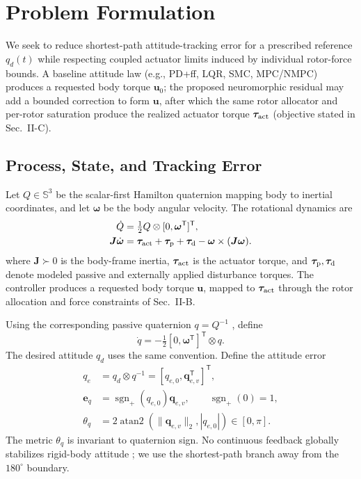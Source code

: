 \documentclass[letterpaper, 10 pt, conference]{ieeeconf}
\newcommand{\T}{^{\mathsf T}}
\newcommand{\sgnp}{\operatorname{sgn}_{+}}
\begin{document}
\section{Problem Formulation}
\label{sec:problem}
We seek to reduce shortest-path attitude-tracking error for a prescribed reference $q_d(t)$ while respecting coupled actuator limits induced by individual rotor-force bounds. A baseline attitude law (e.g., PD+ff, LQR, SMC, MPC/NMPC) produces a requested body torque $\bm u_0$; the proposed neuromorphic residual may add a bounded correction to form $\bm u$, after which the same rotor allocator and per-rotor saturation produce the realized actuator torque $\bm\tau_{\rm act}$ (objective stated in Sec.~II-C).

\subsection{Process, State, and Tracking Error}

Let $Q\in\mathbb S^3$ be the scalar-first Hamilton quaternion mapping body to
inertial coordinates, and let $\bm\omega$ be the body angular velocity. The
rotational dynamics are \cite{schaub2018amss}
\begin{align}
 \dot Q&=\tfrac12 Q\otimes[0,\bm\omega\T]\T,\\
 \bm J\dot{\bm\omega}&=\bm\tau_{\rm act}+\bm\tau_{\rm p}
       +\bm\tau_{\rm d}-\bm\omega\times(\bm J\bm\omega).
 \label{eq:plant}
\end{align}
where $\bm J\succ0$ is the body-frame inertia, $\bm\tau_{\rm act}$ is the actuator torque, and $\bm\tau_{\rm p},\bm\tau_{\rm d}$ denote modeled passive and externally applied disturbance torques. The controller produces a requested body torque $\bm u$, mapped to $\bm\tau_{\rm act}$ through the rotor allocation and force constraints of Sec.~II-B.

Using the corresponding passive quaternion $q=Q^{-1}$ \cite{diebel2006quaternion}, define
\begin{equation}
 \dot q=-\tfrac12[0,\bm\omega\T]\T\otimes q.
 \label{eq:passive}
\end{equation}
The desired attitude $q_d$ uses the same convention. Define the attitude error
\begin{align}
 q_e&=q_d\otimes q^{-1}=[q_{e,0},\bm q_{e,v}\T]\T,\\
 \bm e_q&=\sgnp(q_{e,0})\bm q_{e,v},\qquad \sgnp(0)=1,\\
 \theta_q&=2\operatorname{atan2}(\|\bm q_{e,v}\|_2,|q_{e,0}|)
             \in[0,\pi].
 \label{eq:theta}
\end{align}
The metric $\theta_q$ is invariant to quaternion sign. No continuous feedback globally stabilizes rigid-body attitude \cite{chaturvedi2011rigid}; we use the shortest-path branch away from the $180^\circ$ boundary.
\end{document}
